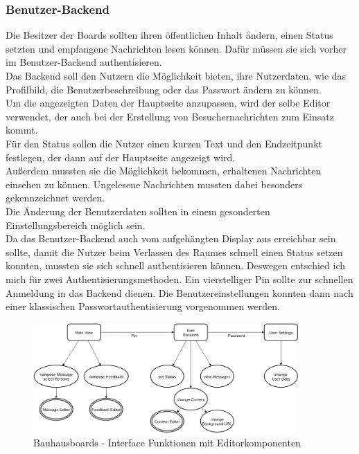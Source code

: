 \subsubsection{Benutzer-Backend}\label{Benutzer-Backend}
Die Besitzer der Boards sollten ihren öffentlichen Inhalt ändern, einen Status setzten und empfangene Nachrichten lesen können.
Dafür müssen sie sich vorher im Benutzer-Backend authentisieren.
\\
Das Backend soll den Nutzern die Möglichkeit bieten, ihre Nutzerdaten, wie das Profilbild, die Benutzerbeschreibung oder das Passwort ändern zu können.
\\
Um die angezeigten Daten der Hauptseite anzupassen, wird der selbe Editor verwendet, der auch bei der Erstellung von Besuchernachrichten zum Einsatz kommt.
\\
Für den Status sollen die Nutzer einen kurzen Text und den Endzeitpunkt festlegen, der dann auf der Hauptseite angezeigt wird.
\\
Außerdem mussten sie die Möglichkeit bekommen, erhaltenen Nachrichten einsehen zu können. Ungelesene Nachrichten mussten dabei besonders gekennzeichnet werden.\\
Die Änderung der Benutzerdaten sollten in einem gesonderten Einstellungsbereich möglich sein.
\\
Da das Benutzer-Backend auch vom aufgehängten Display aus erreichbar sein sollte, damit die Nutzer beim Verlassen des Raumes schnell einen Status setzen konnten, mussten sie sich schnell authentisieren können.
Deswegen entschied ich mich für zwei Authentisierungsmethoden.
Ein vierstelliger Pin sollte zur schnellen Anmeldung in das Backend dienen.
Die Benutzereinstellungen konnten dann nach einer klassischen Passwortauthentisierung vorgenommen werden.
\begin{figure}[h!]
  \centering
    \includegraphics[width=0.9\textwidth]{./img/LocationsFrontend.png}
  \caption{Bauhausboards - Interface Funktionen mit Editorkomponenten}
  \label{img:Interface}
\end{figure}

